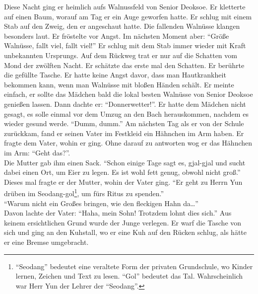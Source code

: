 \documentclass[prd,12pt,tightenlines,notitlepage,nofootinbib]{revtex4-1}
\begin{document}
Diese Nacht ging er heimlich aufs Walnussfeld von Senior Deoksoe.
Er kletterte auf einen Baum, worauf am Tag er ein Auge geworfen hatte.
Er schlug mit einem Stab auf den Zweig, den er angeschaut hatte.
Die fallenden Walnüsse klangen besonders laut.
Er fröstelte vor Angst.
Im nächsten Moment aber: "`Größe Walnüsse, fallt viel, fallt viel!"'
Er schlug mit dem Stab immer wieder mit Kraft unbekannten Ursprungs.
Auf dem Rückweg trat er nur auf die Schatten vom Mond der zwölften Nacht.
Er schätzte das erste mal den Schatten.
Er berührte die gefüllte Tasche.
Er hatte keine Angst davor, dass
man Hautkrankheit bekommen kann, wenn
man Walnüsse mit bloßen Händen schält.
Er meinte einfach,
er sollte das Mädchen bald die lokal besten Walnüsse von Senior Deoksoe
genießen lassen.
Dann dachte er: "`Donnerwetter!"'.
Er hatte dem Mädchen nicht gesagt,
es solle einmal vor dem Umzug an den Bach herauskommen,
nachdem es wieder gesund werde.
"`Dumm, dumm."'
Am nächsten Tag als er von der Schule zurückkam,
fand er seinen Vater im Festkleid ein Hähnchen im Arm haben.
Er fragte dem Vater, wohin er ging.
Ohne darauf zu antworten wog er das Hähnchen im Arm:
"`Geht das?"'.
\\ Die Mutter gab ihm einen Sack.
"`Schon einige Tage sagt es, gjal-gjal
und sucht dabei einen Ort, um Eier zu legen.
Es ist wohl fett genug, obwohl nicht groß."'
Dieses mal fragte er der Mutter, wohin der Vater ging.
"`Er geht zu Herrn Yun drüben im Seodang-gol\footnote{
"`Seodang"' bedeutet eine veraltete Form der privaten Grundschule,
wo Kinder lernen,
Zeichen und Text zu lesen.
"`Gol"' bedeutet das Tal.
Wahrscheinlich war Herr Yun der Lehrer der "`Seodang"'.},
um fürs Ritus zu spenden."'
\\ "`Warum nicht ein Großes bringen, wie den fleckigen Hahn da\ldots"'
\\ Davon lachte der Vater: "`Haha, mein Sohn!
Trotzdem lohnt dies sich."'
Aus keinem ersichtlichen Grund wurde der Junge verlegen.
Er warf die Tasche von sich und ging an den Kuhstall,
wo er eine Kuh auf den Rücken schlug,
als hätte er eine Bremse umgebracht.
\end{document}
